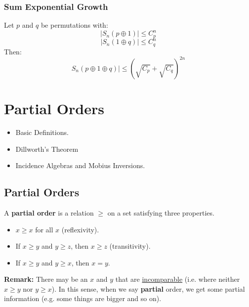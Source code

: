\documentclass[letterpaper]{article}
\begin{document}
\subsubsection{Sum Exponential Growth}
\begin{theorem}{}{}
    Let $p$ and $q$ be permutations with:
    \[|S_{n}(p \oplus 1)| \leq C_{p}^n\]
    \[|S_{n}(1 \oplus q)| \leq C_{q}^n\]
    Then:
    \[S_{n}(p \oplus 1 \oplus q)| \leq (\sqrt{C_p} + \sqrt{C_q})^{2n}\]
\end{theorem}







\newpage 
\section{Partial Orders}
\begin{itemize}
    \item Basic Definitions. 
    \item Dillworth's Theorem
    \item Incidence Algebras and Mobius Inversions. 
\end{itemize}

\subsection{Partial Orders}
\begin{definition}{}{}
    A \textbf{partial order} is a relation $\geq$ on a set satisfying three properties. 
    \begin{itemize}
        \item $x \geq x$ for all $x$ (reflexivity). 
        \item If $x \geq y$ and $y \geq z$, then $x \geq z$ (transitivity). 
        \item If $x \geq y$ and $y \geq x$, then $x = y$. 
    \end{itemize}
\end{definition}

\textbf{Remark:} There may be an $x$ and $y$ that are \underline{incomparable} (i.e. where neither $x \geq y$ nor $y \geq x$). In this sense, when we say \textbf{partial} order, we get some partial information (e.g. some things are bigger and so on). 
\end{document}
